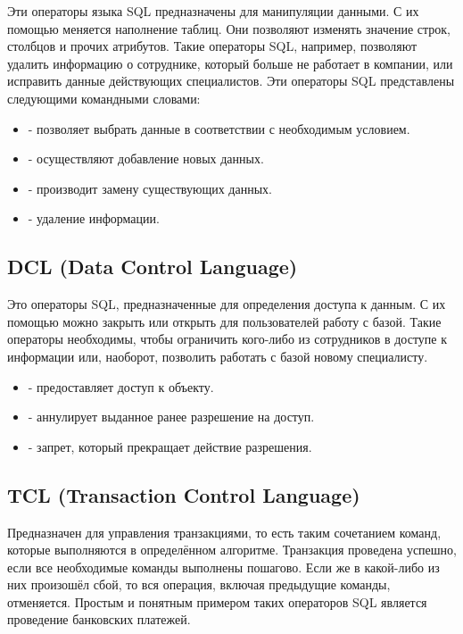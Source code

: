 Эти операторы языка SQL предназначены для манипуляции данными. С их помощью меняется наполнение таблиц. Они позволяют изменять значение строк, столбцов и прочих атрибутов. Такие операторы SQL, например, позволяют удалить информацию о сотруднике, который больше не работает в компании, или исправить данные действующих специалистов. Эти операторы SQL представлены следующими командными словами:

\begin{itemize}
    \item {} - позволяет выбрать данные в соответствии с необходимым условием.
    \item {} - осуществляют добавление новых данных.
    \item {} - производит замену существующих данных.
    \item {} - удаление информации.
\end{itemize}

\subsection{DCL (Data Control Language)}

Это операторы SQL, предназначенные для определения доступа к данным. С их помощью можно закрыть или открыть для пользователей работу с базой. Такие операторы необходимы, чтобы ограничить кого-либо из сотрудников в доступе к информации или, наоборот, позволить работать с базой новому специалисту.

\begin{itemize}
    \item {} - предоставляет доступ к объекту.
    \item {} - аннулирует выданное ранее разрешение на доступ.
    \item {} - запрет, который прекращает действие разрешения.
\end{itemize}

\subsection{TCL (Transaction Control Language)}

Предназначен для управления транзакциями, то есть таким сочетанием команд, которые выполняются в определённом алгоритме. Транзакция проведена успешно, если все необходимые команды выполнены пошагово. Если же в какой-либо из них произошёл сбой, то вся операция, включая предыдущие команды, отменяется. Простым и понятным примером таких операторов SQL является проведение банковских платежей.

